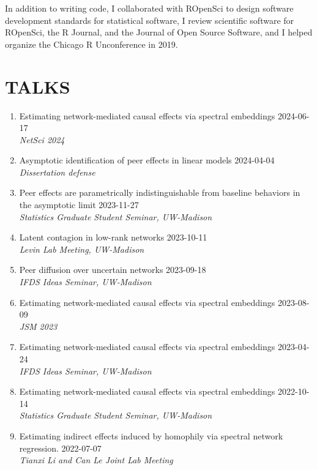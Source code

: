 \documentclass[11pt]{article}
\begin{document}
\vspace{0.2cm}
In addition to writing code, I collaborated with ROpenSci to design software development standards for statistical software, I review scientific software for ROpenSci, the R Journal, and the Journal of Open Source Software, and I helped organize the Chicago R Unconference in 2019.

\section*{TALKS}

\begin{enumerate}
    \item Estimating network-mediated causal effects via spectral embeddings  \hfill 2024-06-17 \\ \emph{\small NetSci 2024}
    \item Asymptotic identification of peer effects in linear models \hfill 2024-04-04 \\  \emph{\small Dissertation defense}
    \item Peer effects are parametrically indistinguishable from baseline behaviors in the asymptotic limit \hfill 2023-11-27 \\ \emph{\small Statistics Graduate Student Seminar, UW-Madison}
    \item Latent contagion in low-rank networks \hfill 2023-10-11 \\  \emph{\small Levin Lab Meeting, UW-Madison}
    \item Peer diffusion over uncertain networks \hfill 2023-09-18 \\ \emph{\small IFDS Ideas Seminar, UW-Madison}
    \item Estimating network-mediated causal effects via spectral embeddings \hfill 2023-08-09 \\ \emph{\small JSM 2023}
    \item Estimating network-mediated causal effects via spectral embeddings  \hfill 2023-04-24 \\ \emph{\small IFDS Ideas Seminar, UW-Madison}
    \item Estimating network-mediated causal effects via spectral embeddings \hfill 2022-10-14 \\ \emph{\small Statistics Graduate Student Seminar, UW-Madison}
    \item Estimating indirect effects induced by homophily via spectral network regression. \hfill 2022-07-07 \\ \emph{\small Tianxi Li and Can Le Joint Lab Meeting}

\end{enumerate}
\end{document}
